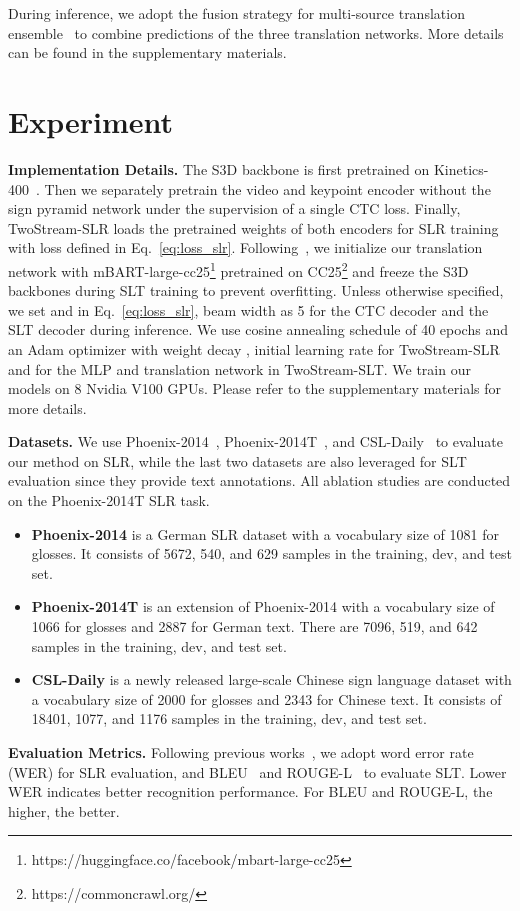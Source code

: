 \documentclass{article}
\begin{document}
During inference, we adopt the fusion strategy for multi-source translation ensemble~\cite{firat2016zero} to combine predictions of the three translation networks. More details can be found in the supplementary materials.  
 \section{Experiment}
\noindent \textbf{Implementation Details.} 
The S3D backbone is first pretrained on Kinetics-400~\cite{kay2017kinetics}. Then we separately pretrain the video and keypoint encoder without the sign pyramid network under the supervision of a single CTC loss. Finally, TwoStream-SLR loads the pretrained weights of both encoders for SLR training with loss defined in Eq.~\ref{eq:loss_slr}. Following~\cite{MMTLB_2022}, we initialize our translation network with mBART-large-cc25\footnote[2]{https://huggingface.co/facebook/mbart-large-cc25} pretrained on CC25\footnote[3]{https://commoncrawl.org/} and freeze the S3D backbones during SLT training to prevent overfitting. Unless otherwise specified, we set  and  in Eq.~\ref{eq:loss_slr}, beam width as 5 for the CTC decoder and the SLT decoder during inference. We use cosine annealing schedule of 40 epochs and an Adam optimizer with weight decay , initial learning rate  for TwoStream-SLR and  for the MLP and translation network in TwoStream-SLT. We train our models on 8 Nvidia V100 GPUs. Please refer to the supplementary materials for more details.


\noindent \textbf{Datasets.} We use Phoenix-2014~\cite{P2014}, Phoenix-2014T~\cite{camgoz2018neural}, and CSL-Daily~\cite{zhou2021improving} to evaluate our method on SLR, while the last two datasets are also leveraged for SLT evaluation since they provide text annotations. All ablation studies are conducted on the Phoenix-2014T SLR task. \begin{itemize}[leftmargin=0.33cm]
    \item \textbf{Phoenix-2014} is a German SLR dataset with a vocabulary size of 1081 for glosses. It consists of 5672, 540, and 629 samples in the training, dev, and test set. 
\item \textbf{Phoenix-2014T} is an extension of Phoenix-2014 with a vocabulary size of 1066 for glosses and 2887 for German text. There are 7096, 519, and 642 samples in the training, dev, and test set.
\item \textbf{CSL-Daily} is a newly released large-scale Chinese sign language dataset with a vocabulary size of 2000 for glosses and 2343 for Chinese text. It consists of 18401, 1077, and 1176 samples in the training, dev, and test set.
\end{itemize}
\textbf{Evaluation Metrics.} Following previous works~\cite{STMC_MM, MMTLB_2022, camgoz2020sign, camgoz2018neural, zhou2021improving}, we adopt word error rate (WER) for SLR evaluation, and BLEU~\cite{papineni2002bleu} and ROUGE-L~\cite{lin2004rouge} to evaluate SLT. Lower WER indicates better recognition performance. For BLEU and ROUGE-L, the higher, the better. 
\end{document}
